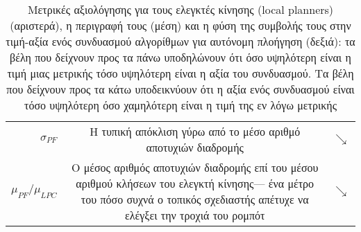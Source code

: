 \begin{table}
\begin{tabular}{rcc}
    $\sigma_{PF}$ &
    \begin{minipage}[t]{0.7\columnwidth}%
      Η τυπική απόκλιση γύρω από το μέσο αριθμό αποτυχιών διαδρομής
    \end{minipage} & $\searrow$ \\
    $\mu_{PF} / \mu_{LPC}$ &
    \begin{minipage}[t]{0.7\columnwidth}%
      Ο μέσος αριθμός αποτυχιών διαδρομής επί του μέσου αριθμού κλήσεων του
      ελεγκτή κίνησης--- ένα μέτρο του πόσο συχνά ο τοπικός σχεδιαστής απέτυχε
      να ελέγξει την τροχιά του ρομπότ
    \end{minipage} & $\searrow$ \\ \bottomrule
  \end{tabular}
  \caption{\small Μετρικές αξιολόγησης για τους ελεγκτές κίνησης
           (local planners) (αριστερά), η περιγραφή τους (μέση) και η φύση
           της συμβολής τους στην τιμή-αξία ενός συνδυασμού αλγορίθμων για
           αυτόνομη πλοήγηση (δεξιά): τα βέλη που δείχνουν προς τα πάνω
           υποδηλώνουν ότι όσο υψηλότερη είναι η τιμή μιας μετρικής τόσο
           υψηλότερη είναι η αξία του συνδυασμού. Tα βέλη που δείχνουν προς τα
           κάτω υποδεικνύουν ότι η αξία ενός συνδυασμού είναι τόσο υψηλότερη
           όσο χαμηλότερη είναι η τιμή της εν λόγω μετρικής}
  \label{tbl:metrics_and_proportionality_local_planners}
\end{table}

